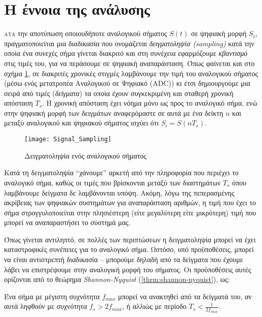 


\section{Η έννοια της ανάλυσης}

\lettrine[findent=2pt]{}{ατά} την αποτύπωση οποιουδήποτε αναλογικού σήματος $S(t)$ σε ψηφιακή μορφή $S_i$, πραγματοποιείται μια διαδικασία που ονομάζεται \emph{δειγματοληψία (sampling)} κατά την οποία ένα συνεχές σήμα γίνεται διακριτό και στη συνέχεια εφαρμόζουμε \emph{κβαντισμό} στις τιμές του, για να περάσουμε σε ψηφιακή αναπαράσταση. Όπως φαίνεται και στο σχήμα \ref{fig:sampling}, σε διακριτές χρονικές στιγμές λαμβάνουμε την τιμή του αναλογικού σήματος (μέσω ενός μετατροπέα Αναλογικού σε Ψηφιακό (ADC)) κι έτσι δημιουργούμε μια σειρά από τιμές (\emph{δείγματα}) τα οποία έχουν συγκεκριμένη και σταθερή χρονική απόσταση $T_s$. Η χρονική απόσταση έχει νόημα μόνο ως προς το αναλογικό σήμα, ενώ στην ψηφιακή μορφή των δειγμάτων αναφερόμαστε σε αυτά με ένα δείκτη $n$ και μεταξύ αναλογικού και ψηφιακού σήματος ισχύει ότι $S_i=S(nT_s)$.
\begin{figure}[h]
  \centering
  \texttt{[image: Signal\_Sampling]}
  \caption{Δειγματοληψία ενός αναλογικού σήματος}
  \label{fig:sampling}
\end{figure}
Κατά τη δειγματοληψία ``χάνουμε'' αρκετή από την πληροφορία που περιέχει το αναλογικό σήμα, καθώς οι τιμές που βρίσκονται μεταξύ των διαστημάτων $T_s$ όπου λαμβάνουμε δείγματα δε λαμβάνονται υπόψη. Ακόμη, λόγω της πεπερασμένης ακρίβειας των ψηφιακών συστημάτων για αναπαράσταση αριθμών, η τιμή που έχει το σήμα στρογγυλοποιείται στην πλησιέστερη (είτε μεγαλύτερη είτε μικρότερη) τιμή που μπορεί να αναπαραστήσει το σύστημά μας.

Όπως γίνεται αντιληπτό, σε πολλές των περιπτώσεων η δειγματοληψία μπορεί να έχει καταστροφικές συνέπειες για το αναλογικό σήμα. Ωστόσο, υπό προϋποθέσεις, μπορεί να είναι αντιστρεπτή διαδικασία -- μπορούμε δηλαδή από τα δείγματα που έχουμε λάβει να επιστρέψουμε στην αναλογική μορφή του σήματος. Οι προϋποθέσεις αυτές ορίζονται από το θεώρημα \emph{Shannon-Nyquist} (\ref{thrm:shannon-nyquist}), ως:
\\
\begin{theorem}
	\label{thrm:shannon-nyquist}
	Ένα σήμα με μέγιστη συχνότητα $f_{max}$ μπορεί να ανακτηθεί από τα δείγματά του, αν αυτά ληφθούν με συχνότητα $f_s>2f_{max}$, ή αλλιώς με περίοδο $T_s<\frac{1}{2f_{max}}$. \cite{proakis_sampling}
\end{theorem}